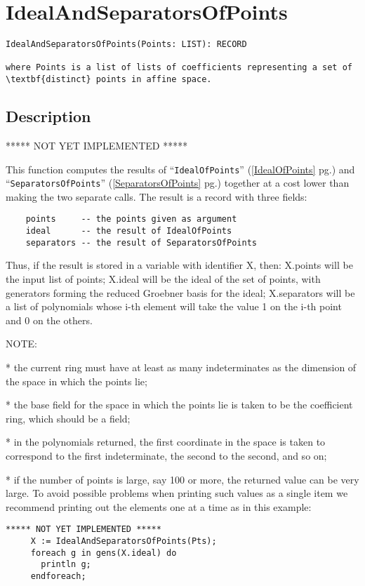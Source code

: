 \documentclass[a4paper]{mybook}
\newenvironment{command}{}{} %
\begin{document}
\section{IdealAndSeparatorsOfPoints}
\label{IdealAndSeparatorsOfPoints}
\begin{command} %


\begin{Verbatim}[label=syntax, rulecolor=\color{MidnightBlue},
frame=single]
IdealAndSeparatorsOfPoints(Points: LIST): RECORD

where Points is a list of lists of coefficients representing a set of
\textbf{distinct} points in affine space.
\end{Verbatim}


\subsection*{Description}

***** NOT YET IMPLEMENTED *****
\par 
This function computes the results of ``\verb&IdealOfPoints&'' (\ref{IdealOfPoints} pg.\pageref{IdealOfPoints}) and
``\verb&SeparatorsOfPoints&'' (\ref{SeparatorsOfPoints} pg.\pageref{SeparatorsOfPoints}) together at a cost lower than making the two
separate calls.  The result is a record with three fields:
\begin{verbatim}
    points     -- the points given as argument
    ideal      -- the result of IdealOfPoints
    separators -- the result of SeparatorsOfPoints
\end{verbatim}
Thus, if the result is stored in a variable with identifier X, then:
X.points will be the input list of points;
X.ideal will be the ideal of the set of points, with generators
forming the reduced Groebner basis for the ideal;
X.separators will be a list of polynomials whose i-th element will
take the value 1 on the i-th point and 0 on the others.
\par 
NOTE:
\par 
 * the current ring must have at least as many indeterminates as the
   dimension of the space in which the points lie;
\par 
 * the base field for the space in which the points lie is taken to be
   the coefficient ring, which should be a field;
\par 
 * in the polynomials returned, the first coordinate in the space is
   taken to correspond to the first indeterminate, the second to the
   second, and so on;
\par 
 * if the number of points is large, say 100 or more, the returned
   value can be very large.  To avoid possible problems when printing
   such values as a single item we recommend printing out the elements
   one at a time as in this example:
\begin{verbatim}
***** NOT YET IMPLEMENTED *****
     X := IdealAndSeparatorsOfPoints(Pts);
     foreach g in gens(X.ideal) do
       println g;
     endforeach;
\end{verbatim}


\end{command}
\end{document}
